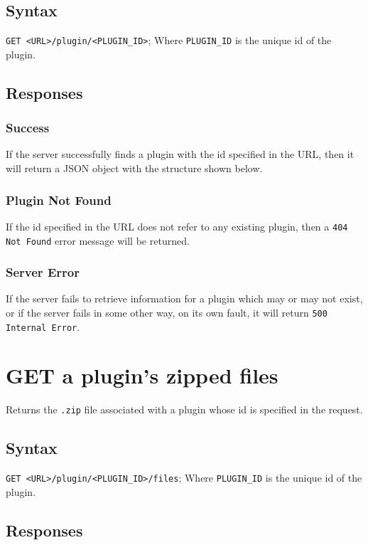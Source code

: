 \documentclass[a4paper, 12pt]{article}
\begin{document}
		\subsection{Syntax}
			\verb|GET <URL>/plugin/<PLUGIN_ID>|; \footnotesize{Where \verb|PLUGIN_ID| is the unique id of the plugin.}

		\subsection{Responses}
			\subsubsection{Success}
				If the server successfully finds a plugin with the id specified in the URL, then it will return a JSON object with the structure shown below.

				

			\subsubsection{Plugin Not Found}
				If the id specified in the URL does not refer to any existing plugin, then a \verb|404 Not Found| error message will be returned.

			\subsubsection{Server Error}
				If the server fails to retrieve information for a plugin which may or may not exist, or if the server fails in some other way, on its own fault, it will return \verb|500 Internal Error|.

	\section{GET a plugin's zipped files}
		Returns the \verb|.zip| file associated with a plugin whose id is specified in the request.

		\subsection{Syntax}
			\verb|GET <URL>/plugin/<PLUGIN_ID>/files|; \footnotesize{Where \verb|PLUGIN_ID| is the unique id of the plugin.}

		\subsection{Responses}
\end{document}
